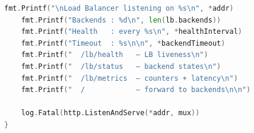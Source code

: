 \documentclass[12pt,a4paper]{article}
\begin{document}
\begin{lstlisting}[language=Go, caption=Load Balancer Full Implementation]
	fmt.Printf("\nLoad Balancer listening on %s\n", *addr)
	fmt.Printf("Backends : %d\n", len(lb.backends))
	fmt.Printf("Health   : every %s\n", *healthInterval)
	fmt.Printf("Timeout  : %s\n\n", *backendTimeout)
	fmt.Printf("  /lb/health   — LB liveness\n")
	fmt.Printf("  /lb/status   — backend states\n")
	fmt.Printf("  /lb/metrics  — counters + latency\n")
	fmt.Printf("  /            — forward to backends\n\n")

	log.Fatal(http.ListenAndServe(*addr, mux))
}
\end{lstlisting}
\end{document}
